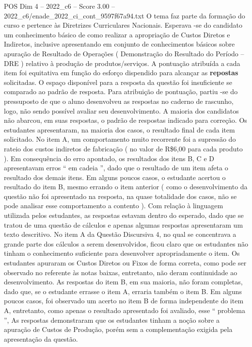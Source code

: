\begin{textsample}{POS Dim 4 – 2022\_c6 – Score 3.00 – 2022\_c6/enade\_2022\_ci\_cont\_9597f67a94.txt}
O tema faz parte da formação do curso e pertence às Diretrizes Curriculares Nacionais.
Esperava -se do candidato um conhecimento básico de como realizar a apropriação de Custos Diretos e Indiretos, inclusive apresentando em conjunto de conhecimentos básicos sobre apuração de Resultado de Operações ( Demonstração do Resultado do Período – DRE ) relativo à produção de produtos/serviços.
A pontuação atribuída a cada item foi equitativa em função do esforço dispendido para alcançar as \textbf{repostas} solicitadas.
O espaço disponível para a resposta da questão foi insuficiente se comparado ao padrão de resposta.
Para atribuição de pontuação, partiu -se do pressuposto de que o aluno desenvolveu as respostas no caderno de rascunho, logo, não sendo possível avaliar seu desenvolvimento.
A maioria dos candidatos não abarcou, em suas respostas, o padrão de respostas indicado para correção.
Os estudantes apresentaram, na maioria dos casos, o resultado final de cada item solicitado.
No item A, um comportamento muito recorrente foi a supressão do rateio dos custos indiretos de fabricação ( no valor de R\$6,00 para cada produto ).
Em consequência do erro apontado, os resultados dos itens B, C e D apresentavam erros “ em cadeia ”, dado que o resultado de um item afeta o resultado dos demais itens.
Em alguns poucos casos, o estudante acertou o resultado do item B, mesmo errando o item anterior ( como o desenvolvimento da questão não foi apresentado na resposta, na quase totalidade dos casos, não se pode analisar esse comportamento a contento ).
Com relação à linguagem utilizada pelos estudantes, as respostas estavam dentro do esperado, dado que se tratou de uma questão de cálculos e apenas algumas respostas apresentaram um texto descritivo.
No item A da Questão Discursiva 4, no qual se concentrava a grande parte dos cálculos a serem desenvolvidos, ficou claro que os estudantes não tinham o conhecimento suficiente para desenvolver apropriadamente o item.
Os estudantes apuraram os Custos Diretos ou Fixos de forma correta, como pode ser observado no referente às notas baixas, entretanto, não deram continuidade ao desenvolvimento.
As respostas do item B, em sua maioria, não foram completas, dado que, se o estudante errasse o item A, erraria também o item B.
Em alguns poucos casos, foi observado um acerto no item B de forma independente do item A, entretanto, como apenas o resultado apresentado foi avaliado, esse “ problema ”, As respostas demonstraram que os estudantes tinham a noção sobre a apuração de Custos de Produção, porém sem a complementação exigida pela apresentação da questão.

\end{textsample}
